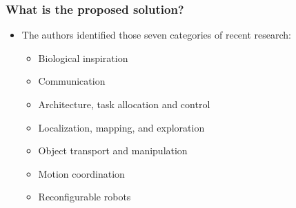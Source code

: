     \subsubsection*{What is the proposed solution?}
    \begin{itemize}
        \item The authors identified those seven categories of recent research: \ 
        \begin{itemize}
            \item Biological inspiration
            \item Communication
            \item Architecture, task allocation and control
            \item Localization, mapping, and exploration
            \item Object transport and manipulation
            \item Motion coordination 
            \item Reconfigurable robots
        \end{itemize}
    \end{itemize}
